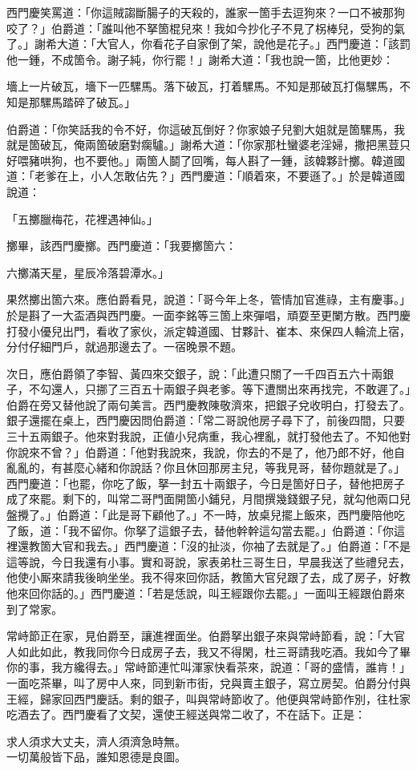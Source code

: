 西門慶笑罵道：「你這賊謅斷腸子的天殺的，誰家一箇手去逗狗來？一口不被那狗咬了？」伯爵道：「誰叫他不拏箇棍兒來！我如今抄化子不見了柺棒兒，受狗的氣了。」{}謝希大道：「大官人，你看花子自家倒了架，說他是花子。」西門慶道：「該罰他一鍾，不成箇令。謝子純，你行罷！」謝希大道：「我也說一箇，比他更妙：

\begin{myquote}
墻上一片破瓦，墻下一匹騾馬。落下破瓦，打着騾馬。不知是那破瓦打傷騾馬，不知是那騾馬踏碎了破瓦。」
\end{myquote}

伯爵道：「你笑話我的令不好，你這破瓦倒好？你家娘子兒劉大姐就是箇騾馬，我就是箇破瓦，俺兩箇破磨對瘸驢。」謝希大道：「你家那杜蠻婆老淫婦，撒把黑荳只好喂豬哄狗，也不要他。」兩箇人鬬了回嘴，每人斟了一鍾，該韓夥計擲。韓道國道：「老爹在上，小人怎敢佔先？」西門慶道：「順着來，不要遜了。」於是韓道國說道：

\begin{myquote}
「五擲臘梅花，花裡遇神仙。」
\end{myquote}

擲畢，該西門慶擲。西門慶道：「我要擲箇六：

\begin{myquote}
六擲滿天星，星辰冷落碧潭水。」
\end{myquote}

果然擲出箇六來。應伯爵看見，說道：「哥今年上冬，管情加官進祿，主有慶事。」{}於是斟了一大盃酒與西門慶。一面李銘等三箇上來彈唱，頑耍至更闌方散。西門慶打發小優兒出門，看收了家伙，派定韓道國、甘夥計、崔本、來保四人輪流上宿，分付仔細門戶，就過那邊去了。一宿晚景不題。

次日，應伯爵領了李智、黃四來交銀子，說：「此遭只關了一千四百五六十兩銀子，不勾還人，只挪了三百五十兩銀子與老爹。等下遭關出來再找完，不敢遲了。」伯爵在旁又替他說了兩句美言。西門慶教陳敬濟來，把銀子兌收明白，打發去了。銀子還擺在桌上，西門慶因問伯爵道：「常二哥說他房子尋下了，前後四間，只要三十五兩銀子。他來對我說，正値小兒病重，我心裡亂，就打發他去了。不知他對你說來不曾？」伯爵道：「他對我說來，我說，你去的不是了，他乃郎不好，他自亂亂的，有甚麼心緒和你說話？你且休回那房主兒，等我見哥，替你題就是了。」西門慶道：「也罷，你吃了飯，拏一封五十兩銀子，今日是箇好日子，替他把房子成了來罷。剩下的，叫常二哥門面開箇小鋪兒，月間撰幾錢銀子兒，就勾他兩口兒盤攪了。」{}伯爵道：「此是哥下顧他了。」不一時，放桌兒擺上飯來，西門慶陪他吃了飯，道：「我不留你。你拏了這銀子去，替他幹幹這勾當去罷。」伯爵道：「你這裡還教箇大官和我去。」西門慶道：「沒的扯淡，你袖了去就是了。」伯爵道：「不是這等說，今日我還有小事。實和哥說，家表弟杜三哥生日，早晨我送了些禮兒去，他使小厮來請我後晌坐坐。我不得來回你話，教箇大官兒跟了去，成了房子，好教他來回你話的。」西門慶道：「若是恁說，叫王經跟你去罷。」一面叫王經跟伯爵來到了常家。

常峙節正在家，見伯爵至，讓進裡面坐。伯爵拏出銀子來與常峙節看，說：「大官人如此如此，教我同你今日成房子去，我又不得閑，杜三哥請我吃酒。我如今了畢你的事，我方纔得去。」常峙節連忙叫渾家快看茶來，說道：「哥的盛情，誰肯！」一面吃茶畢，叫了房中人來，同到新市街，兌與賣主銀子，寫立房契。伯爵分付與王經，歸家回西門慶話。剩的銀子，叫與常峙節收了。他便與常峙節作別，往杜家吃酒去了。西門慶看了文契，還使王經送與常二收了，不在話下。正是：

\begin{myquote}
求人須求大丈夫，濟人須濟急時無。\\一切萬般皆下品，誰知恩德是良圖。
\end{myquote}

